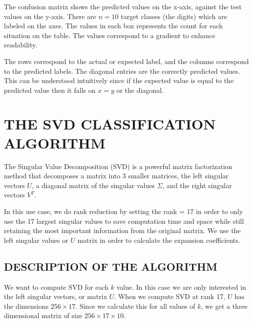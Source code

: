 \documentclass[dvipsnames,12pt]{article} %
\begin{document}
          \vspace{06pt}
          
          The confusion matrix shows the predicted values on the x-axis, against the test values on the y-axis. There are $n=10$ target classes (the digits) which are labeled on the axes. The values in each box represents the count for each situation on the table. The values correspond to a gradient to enhance readability.
          
          \vspace{06pt}
          
          The rows correspond to the actual or expected label, and the columns correspond to the predicted labels. The diagonal entries are the correctly predicted values. This can be understood intuitively since if the expected value is equal to the predicted value then it falls on $x=y$ or the diagonal. 


      \section{THE SVD CLASSIFICATION ALGORITHM}
        \label{SECT 04:SVD CLASSIFICATION ALGORITHM}

        \vspace{06pt}

The Singular Value Decomposition (SVD) is a powerful matrix factorization method that decomposes a matrix into 3 smaller matrices, the left singular vectors $U$, a diagonal matrix of the singular values $\Sigma$, and the right singular vectors $V^T$. 

        \vspace{06pt}

In this use case,  we do rank reduction by setting the rank = 17  in order to only use the 17 largest singular values to save computation time and space while still retaining the most important information from the original matrix. We use the left singular values or $U$ matrix in order to calculate the expansion coefficients.


        \subsection{DESCRIPTION OF THE ALGORITHM}
          \label{SECT 04.01:SVD DESCRIPTION}

          \vspace{06pt}

          We want to compute SVD for each $k$ value. In this case we are only interested in the left singular vectors, or matrix $U$. When we compute SVD at rank 17, $U$ has the dimensions $256\times17$. Since we calculate this for all values of $k$, we get a three dimensional matrix of size $256\times17\times10$.
\end{document}
